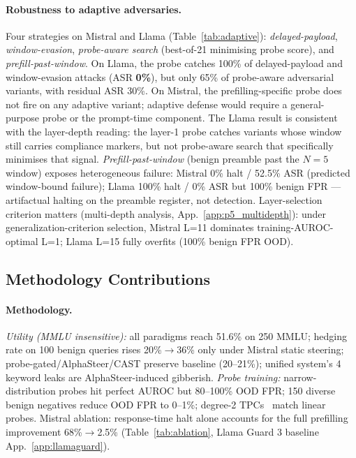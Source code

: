 \documentclass{article}
\begin{document}
\paragraph{Robustness to adaptive adversaries.}
Four strategies on Mistral and Llama (Table~\ref{tab:adaptive}): \emph{delayed-payload}, \emph{window-evasion}, \emph{probe-aware search} (best-of-21 minimising probe score), and \emph{prefill-past-window}. On Llama, the probe catches 100\% of delayed-payload and window-evasion attacks (ASR \textbf{0\%}), but only 65\% of probe-aware adversarial variants, with residual ASR 30\%. On Mistral, the prefilling-specific probe does not fire on any adaptive variant; adaptive defense would require a general-purpose probe or the prompt-time component. The Llama result is consistent with the layer-depth reading: the layer-1 probe catches variants whose window still carries compliance markers, but not probe-aware search that specifically minimises that signal. \emph{Prefill-past-window} (benign preamble past the $N=5$ window) exposes heterogeneous failure: Mistral 0\% halt / 52.5\% ASR (predicted window-bound failure); Llama 100\% halt / 0\% ASR but 100\% benign FPR --- artifactual halting on the preamble register, not detection. Layer-selection criterion matters (multi-depth analysis, App.~\ref{app:p5_multidepth}): under generalization-criterion selection, Mistral L=11 dominates training-AUROC-optimal L=1; Llama L=15 fully overfits (100\% benign FPR OOD).

\subsection{Methodology Contributions}
\label{sec:utility}\label{sec:probes}

\paragraph{Methodology.} \emph{Utility (MMLU insensitive):} all paradigms reach 51.6\% on 250 MMLU; hedging rate on 100 benign queries rises 20\%$\to$36\% only under Mistral static steering; probe-gated/AlphaSteer/CAST preserve baseline (20--21\%); unified system's 4 keyword leaks are AlphaSteer-induced gibberish. \emph{Probe training:} narrow-distribution probes hit perfect AUROC but 80--100\% OOD FPR; 150 diverse benign negatives reduce OOD FPR to 0--1\%; degree-2 TPCs~\citep{tpc2026} match linear probes. Mistral ablation: response-time halt alone accounts for the full prefilling improvement 68\%$\to$2.5\% (Table~\ref{tab:ablation}, Llama Guard 3 baseline App.~\ref{app:llamaguard}).
\end{document}
